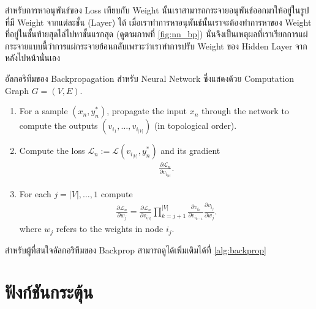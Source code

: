 สำหรับการหาอนุพันธ์ของ Loss เทียบกับ Weight นั้นเราสามารถกระจายอนุพันธ์ออกมาให้อยู่ในรูปที่มี Weight จากแต่ละชั้น (Layer) ได้ 
เมื่อเราทำการหาอนุพันธ์นั้นเราจะต้องทำการหาของ Weight ที่อยู่ในชั้นท้ายสุดไล่ไปหาชั้นแรกสุด (ดูตามภาพที่ \ref{fig:nn_bp})
นั่นจึงเป็นเหตุผลที่เราเรียกการแผ่กระจายแบบนี้ว่าการแผ่กระจายย้อนกลับเพราะว่าเราทำการปรับ Weight ของ Hidden Layer จากหลังไปหน้านั่นเอง

\begin{algorithm}[ht]
    \caption{อัลกอริทึมของ Backpropagation สำหรับ Neural Network ซึ่งแสดงด้วย Computation Graph $G = (V,E)$.}
    \label{alg:backprop}
    \begin{enumerate}
        \item For a sample $(x_n ,y^*_n)$, propagate the input $x_n$ through the
        network to compute the outputs $(v_{i_1}, \ldots, v_{i_{|V|}})$ (in topological order).

        \item Compute the loss $\mathcal{L}_n := \mathcal{L}(v_{i_{|V|}}, y_n^*)$
        and its gradient
        \begin{align}
        \frac{\partial \mathcal{L}_n}{\partial v_{i_{|V|}}}.
        \end{align}

        \item For each $j = |V|,\ldots,1$ compute
        \begin{align}
        \frac{\partial \mathcal{L}_n}{\partial w_j} =
        \frac{\partial \mathcal{L}_n}{\partial v_{i_{|V|}}} \prod_{k = j + 1}^{|V|} 
        \frac{\partial v_{i_k}}{\partial v_{i_{k - 1}}}
        \frac{\partial v_{i_j}}{\partial w_j}.
        \end{align}
        where $w_j$ refers to the weights in node $i_j$.
    \end{enumerate}
\end{algorithm}

สำหรับผู้ที่สนใจอัลกอริทึมของ Backprop สามารถดูได้เพิ่มเติมได้ที่ \ref{alg:backprop}

\section{ฟังก์ชันกระตุ้น}
\label{sec:act_func}

